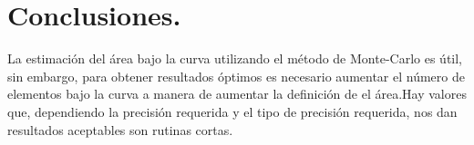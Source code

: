 \documentclass{article}
\begin{document}
\section{Conclusiones.}
La estimación del área bajo la curva utilizando el método de Monte-Carlo es útil, sin embargo, para obtener resultados óptimos es necesario aumentar el número de elementos bajo la curva a manera de aumentar la definición de el área.Hay valores que, dependiendo la precisión requerida y el tipo de precisión requerida, nos dan resultados aceptables son rutinas cortas.


\end{document}
